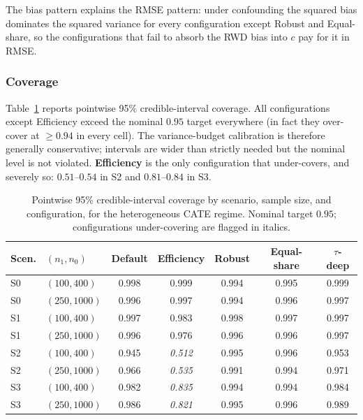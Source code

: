 \documentclass[11pt]{article}
\theoremstyle{plain}
\theoremstyle{definition}
\theoremstyle{remark}
\newcommand{\1}{\mathds{1}}
\begin{document}
The bias pattern explains the RMSE pattern: under confounding the squared
bias dominates the squared variance for every configuration except
Robust and Equal-share, so the configurations that fail to absorb the
RWD bias into $c$ pay for it in RMSE.

\subsubsection*{Coverage}

Table~\ref{tab:sim-prior-coverage-het} reports pointwise 95\%
credible-interval coverage. All configurations except Efficiency exceed
the nominal $0.95$ target everywhere (in fact they over-cover at
$\geq 0.94$ in every cell). The variance-budget calibration is therefore
generally conservative; intervals are wider than strictly needed but the
nominal level is not violated. \textbf{Efficiency} is the only
configuration that under-covers, and severely so: $0.51$--$0.54$ in S2
and $0.81$--$0.84$ in S3.

\begin{table}[tb]
\centering
\small
\caption{Pointwise 95\% credible-interval coverage by scenario, sample
size, and configuration, for the heterogeneous CATE regime. Nominal
target $0.95$; configurations under-covering are flagged in italics.}
\label{tab:sim-prior-coverage-het}
\begin{tabular}{llccccc}
\toprule
Scen. & $(n_1, n_0)$  & Default & Efficiency           & Robust  & Equal-share & $\tau$-deep \\
\midrule
S0    & $(100, 400)$  & 0.998   & 0.999                & 0.994   & 0.995       & 0.999       \\
S0    & $(250, 1000)$ & 0.996   & 0.997                & 0.994   & 0.996       & 0.997       \\
\midrule
S1    & $(100, 400)$  & 0.997   & 0.983                & 0.998   & 0.997       & 0.997       \\
S1    & $(250, 1000)$ & 0.996   & 0.976                & 0.996   & 0.996       & 0.997       \\
\midrule
S2    & $(100, 400)$  & 0.945   & \emph{0.512}         & 0.995   & 0.996       & 0.953       \\
S2    & $(250, 1000)$ & 0.966   & \emph{0.535}         & 0.991   & 0.994       & 0.971       \\
\midrule
S3    & $(100, 400)$  & 0.982   & \emph{0.835}         & 0.994   & 0.994       & 0.984       \\
S3    & $(250, 1000)$ & 0.986   & \emph{0.821}         & 0.995   & 0.996       & 0.989       \\
\bottomrule
\end{tabular}
\end{table}
\end{document}
